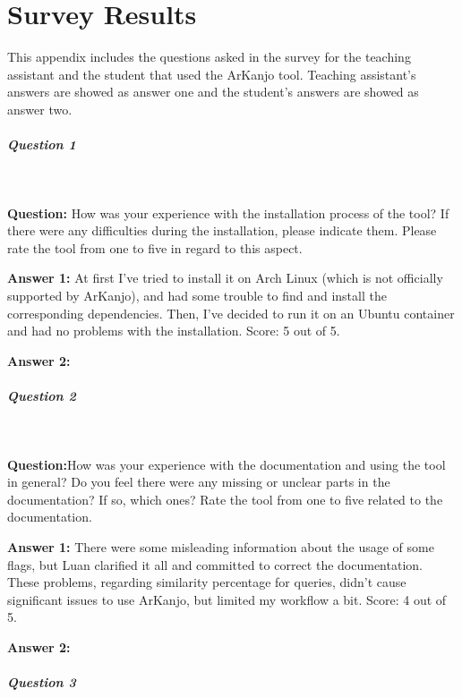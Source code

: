 \chapter{Survey Results}

\label{app:survey}

This appendix includes the questions asked in the survey for the teaching assistant and the
student that used the ArKanjo tool. Teaching assistant's answers are showed as answer one and 
the student's answers are showed as answer two.

\paragraph{Question 1}

\

\textbf{Question:} How was your experience with the installation process of the tool? 
If there were any difficulties during the installation, please indicate them. 
Please rate the tool from one to five in regard to this aspect.

\textbf{Answer 1:} At first I've tried to install it on Arch Linux
(which is not officially supported by ArKanjo), and had some trouble to find and install 
the corresponding dependencies. Then, I've decided to run it on an Ubuntu container and 
had no problems with the installation. Score: 5 out of 5.

\textbf{Answer 2:}

\paragraph{Question 2}

\

\textbf{Question:}How was your experience with the documentation and using the tool in general? 
Do you feel there were any missing or unclear parts in the documentation? If so, which ones?
Rate the tool  from one to five related to the documentation.

\textbf{Answer 1:} There were some misleading information about the usage of some flags, 
but Luan clarified it all and committed to correct the documentation. These problems, 
regarding similarity percentage for queries, didn't cause significant issues to use ArKanjo, 
but limited my workflow a bit. Score: 4 out of 5.

\textbf{Answer 2:}


\paragraph{Question 3}

